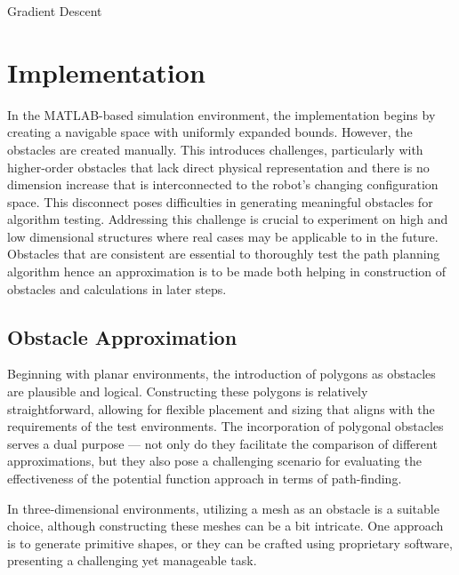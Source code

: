 \documentclass{IEEEtaes}
\newcommand{\algrule}[1][.1pt]{\par\vskip.2\baselineskip\hrule height #1\par\vskip.5\baselineskip}
\begin{document}
{\begin{algorithm}[b]
\caption{Gradient Descent}
\label{alg:gradient-descent}
\end{algorithm}

\section{\large \textbf{Implementation}}

In the MATLAB-based simulation environment, the implementation begins by creating a navigable space with uniformly expanded bounds. However, the obstacles are created manually. This introduces challenges, particularly with higher-order obstacles that lack direct physical representation and there is no dimension increase that is interconnected to the robot's changing configuration space. This disconnect poses difficulties in generating meaningful obstacles for algorithm testing. Addressing this challenge is crucial to experiment on high and low dimensional structures where real cases may be applicable to in the future. Obstacles that are consistent are essential to thoroughly test the path planning algorithm hence an approximation is to be made both helping in construction of obstacles and calculations in later steps.

\subsection{Obstacle Approximation}
Beginning with planar environments, the introduction of polygons as obstacles are plausible and logical. Constructing these polygons is relatively straightforward, allowing for flexible placement and sizing that aligns with the requirements of the test environments. The incorporation of polygonal obstacles serves a dual purpose — not only do they facilitate the comparison of different approximations, but they also pose a challenging scenario for evaluating the effectiveness of the potential function approach in terms of path-finding.

In three-dimensional environments, utilizing a mesh as an obstacle is a suitable choice, although constructing these meshes can be a bit intricate. One approach is to generate primitive shapes, or they can be crafted using proprietary software, presenting a challenging yet manageable task.

}
\end{document}
